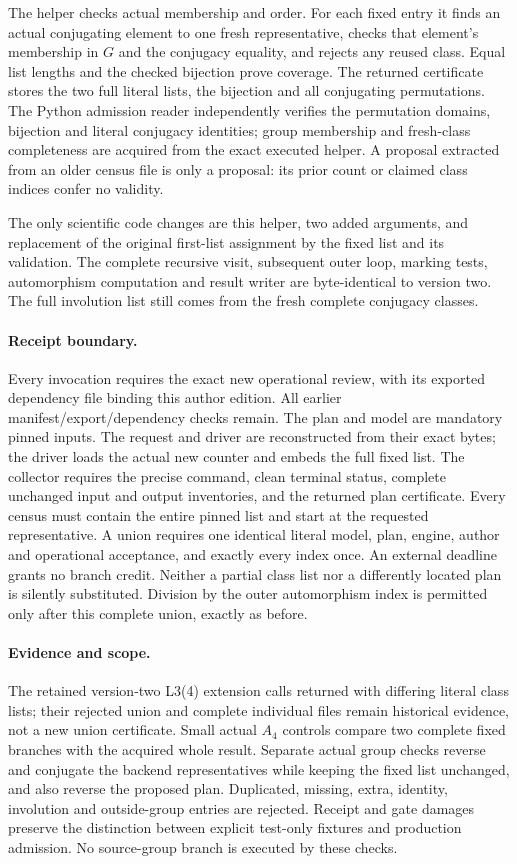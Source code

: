 \documentclass[11pt,a4paper]{article}
\begin{document}
The helper checks actual membership and order. For each fixed entry it
finds an actual conjugating element to one fresh representative, checks
that element's membership in $G$ and the conjugacy equality, and rejects
any reused class. Equal list lengths and the checked bijection prove
coverage. The returned certificate stores the two full literal lists,
the bijection and all conjugating permutations. The Python admission
reader independently verifies the permutation domains, bijection and
literal conjugacy identities; group membership and fresh-class
completeness are acquired from the exact executed helper. A proposal
extracted from an older census file is only a proposal: its prior count
or claimed class indices confer no validity.

The only scientific code changes are this helper, two added arguments,
and replacement of the original first-list assignment by the fixed list
and its validation. The complete recursive visit, subsequent outer loop,
marking tests, automorphism computation and result writer are byte-identical
to version two. The full involution list still comes from the fresh
complete conjugacy classes.

\paragraph{Receipt boundary.}
Every invocation requires the exact new operational review, with its
exported dependency file binding this author edition. All earlier
manifest/export/dependency checks remain. The plan and model are mandatory
pinned inputs. The request and driver are reconstructed from their exact
bytes; the driver loads the actual new counter and embeds the full fixed
list. The collector requires the precise command, clean terminal status,
complete unchanged input and output inventories, and the returned plan
certificate. Every census must contain the entire pinned list and start
at the requested representative. A union requires one identical literal
model, plan, engine, author and operational acceptance, and exactly every
index once. An external deadline grants no branch credit. Neither a
partial class list nor a differently located plan is silently substituted.
Division by the outer automorphism index is permitted only after this
complete union, exactly as before.

\paragraph{Evidence and scope.}
The retained version-two L3(4) extension calls returned with differing
literal class lists; their rejected union and complete individual files
remain historical evidence, not a new union certificate. Small actual
$A_4$ controls compare two complete fixed branches with the acquired
whole result. Separate actual group checks reverse and conjugate the
backend representatives while keeping the fixed list unchanged, and also
reverse the proposed plan. Duplicated, missing, extra, identity,
involution and outside-group entries are rejected. Receipt and gate
damages preserve the distinction between explicit test-only fixtures and
production admission. No source-group branch is executed by these checks.
\end{document}

